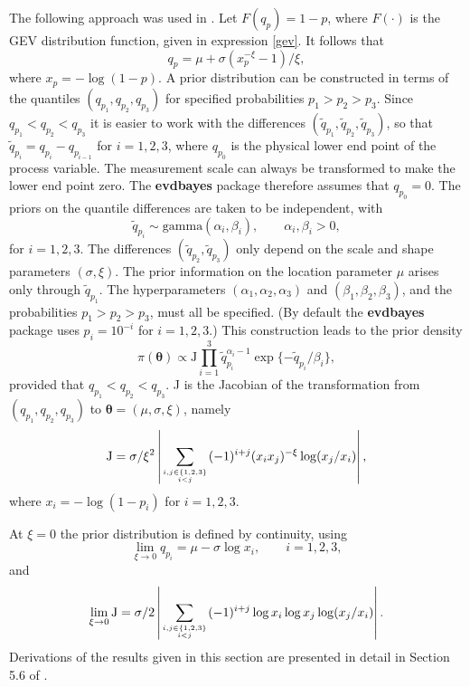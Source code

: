 \documentclass[11pt,a4paper]{article}
\newcommand{\bs}{\boldsymbol}
\newcommand{\sfrac}[2]{\genfrac{}{}{0pt}{}{#1}{#2}}
\begin{document}
The following approach was used in \citet{coletawn96}.
Let  $F(q_p) = 1-p$, where $F(\cdot)$ is the GEV distribution function, given in expression \eqref{gev}. It follows that
\begin{equation*}
q_p = \mu + \sigma(x_p^{-\xi} - 1)/\xi,
\end{equation*}
where $x_p=-\log(1-p)$.
A prior distribution can be constructed in terms of the quantiles $(q_{p_1},q_{p_2},q_{p_3})$ for specified probabilities $p_1 > p_2 > p_3$.
Since $q_{p_1} < q_{p_2} < q_{p_3}$ it is easier to work with the differences $(\tilde{q}_{p_1},\tilde{q}_{p_2},\tilde{q}_{p_3})$, so that $\tilde{q}_{p_i} = q_{p_i} - q_{p_{i-1}}$ for $i=1,2,3$, where $q_{p_0}$ is the physical lower end point of the process variable.
The measurement scale can always be transformed to make the lower end point zero.
The \textbf{evdbayes} package therefore assumes that $q_{p_0} = 0$.
The priors on the quantile differences are taken to be independent, with
\begin{equation*}
\tilde{q}_{p_i} \sim \text{gamma}(\alpha_i,\beta_i), \qquad \alpha_i,\beta_i > 0,
\end{equation*}
for $i=1,2,3$.
The differences $(\tilde{q}_{p_2},\tilde{q}_{p_3})$ only depend on the scale and shape parameters $(\sigma,\xi)$.
The prior information on the location parameter $\mu$ arises only through $\tilde{q}_{p_1}$.
The hyperparameters $(\alpha_1,\alpha_2,\alpha_3)$ and $(\beta_1,\beta_2,\beta_3)$, and the probabilities $p_1 > p_2 > p_3$, must all be specified.
(By default the \textbf{evdbayes} package uses $p_i=10^{-i}$ for $i=1,2,3$.)
This construction leads to the prior density
\begin{equation}
\pi(\bs{\theta}) \propto \text{J}
\prod_{i=1}^{3} \tilde{q}_{p_i}^{\alpha_i-1} \exp\{-\tilde{q}_{p_i}/\beta_i\},
\label{priorgamma}
\end{equation}
provided that $q_{p_1} < q_{p_2} < q_{p_3}$. J is the Jacobian of the transformation from $(q_{p_1},q_{p_2},q_{p_3})$ to $\bs{\theta}=(\mu,\sigma,\xi)$, namely
\begin{equation*}
\text{J} = \sigma/\xi^2 \left| \sum_{\sfrac{i,j \in \{1,2,3\}}{i < j}} (-1)^{i+j} (x_ix_j)^{-\xi} \log (x_j / x_i) \right|,
\end{equation*}
where $x_i = -\log(1 - p_i)$ for $i=1,2,3$.

At $\xi=0$ the prior distribution is defined by continuity, using
\begin{equation*}
\lim_{\xi\rightarrow0}q_{p_i} = \mu-\sigma \log x_i, \qquad i=1,2,3,
\end{equation*}
and
\begin{equation*}
\lim_{\xi\rightarrow0}\text{J} = \sigma/2 \left| \sum_{\sfrac{i,j \in \{1,2,3\}}{i < j}} (-1)^{i+j} \log x_i \log x_j \log (x_j / x_i) \right|.
\end{equation*}
Derivations of the results given in this section are presented in detail in Section 5.6 of \citet{step:phd}.
\end{document}
